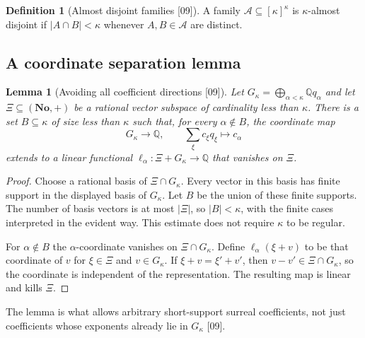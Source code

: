 \documentclass[11pt,letterpaper]{article}
\numberwithin{equation}{section}
\newtheorem{lemma}[theorem]{Lemma}
\theoremstyle{definition}
\newtheorem{definition}[theorem]{Definition}
\theoremstyle{remark}
\newcommand{\No}{\mathbf{No}}
\newcommand{\Q}{\mathbb Q}
\newcommand{\abs}[1]{\lvert#1\rvert}
\newcommand{\src}[1]{\textup{\textsf{\small[#1]}}}%
\begin{document}
\begin{definition}[Almost disjoint families \src{09}]
A family $\mathcal A\subseteq[\kappa]^\kappa$ is $\kappa$-almost disjoint if
$\abs{A\cap B}<\kappa$ whenever $A,B\in\mathcal A$ are distinct.
\end{definition}

\subsection{A coordinate separation lemma}
\begin{lemma}[Avoiding all coefficient directions \src{09}]\label{lce:sg:lem:separate}
Let $G_\kappa=\bigoplus_{\alpha<\kappa}\Q q_\alpha$ and let
$\Xi\subseteq(\No,+)$ be a rational vector subspace of cardinality less
than $\kappa$. There is a set $B\subseteq\kappa$ of size less than $\kappa$
such that, for every $\alpha\notin B$, the coordinate map
\[
 G_\kappa\longrightarrow\Q,\qquad
 \sum_\xi c_\xi q_\xi\longmapsto c_\alpha
\]
extends to a linear functional $\ell_\alpha:\Xi+G_\kappa\to\Q$ that
vanishes on $\Xi$.
\end{lemma}
\begin{proof}
Choose a rational basis of $\Xi\cap G_\kappa$. Every vector in this basis
has finite support in the displayed basis of $G_\kappa$. Let $B$ be the
union of these finite supports. The number of basis vectors is at most
$\abs\Xi$, so $\abs B<\kappa$, with the finite cases interpreted in the
evident way. This estimate does not require $\kappa$ to be regular.

For $\alpha\notin B$ the $\alpha$-coordinate vanishes on $\Xi\cap
G_\kappa$. Define $\ell_\alpha(\xi+v)$ to be that coordinate of $v$ for
$\xi\in\Xi$ and $v\in G_\kappa$. If $\xi+v=\xi'+v'$, then $v-v'\in\Xi\cap
G_\kappa$, so the coordinate is independent of the representation. The
resulting map is linear and kills $\Xi$.
\end{proof}
The lemma is what allows arbitrary short-support surreal coefficients, not
just coefficients whose exponents already lie in $G_\kappa$ \src{09}.
\end{document}

